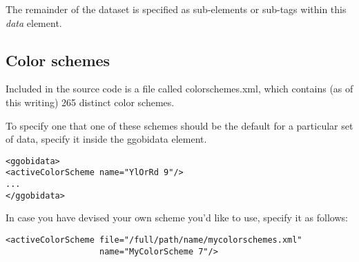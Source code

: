 \documentclass{article}
\def\XMLTag#1{\textit{#1}}
\def\XMLElement#1{\XMLTag{#1}}
\begin{document}
The remainder of the dataset is specified as sub-elements or sub-tags
within this \XMLElement{data} element.

\subsection{Color schemes}

Included in the source code is a file called colorschemes.xml,
which contains (as of this writing) 265 distinct color schemes.

To specify one that one of these schemes should be the default
for a particular set of data, specify it inside the ggobidata
element.
\begin{verbatim}
<ggobidata>
<activeColorScheme name="YlOrRd 9"/>
...
</ggobidata>
\end{verbatim}

In case you have devised your own scheme you'd like to use, 
specify it as follows:

\begin{verbatim}
<activeColorScheme file="/full/path/name/mycolorschemes.xml"
                   name="MyColorScheme 7"/>
\end{verbatim}
\end{document}
